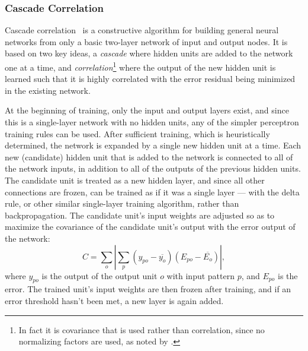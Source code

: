 \documentclass[thesis]{subfiles}
\begin{document}
	\subsubsection{Cascade Correlation}
	Cascade correlation~\citep{Fahlman1989} is a constructive algorithm for building general neural networks from only a basic two-layer network of input and output nodes. It is based on two key ideas, a \emph{cascade} where hidden units are added to the network one at a time, and \emph{correlation}\footnote{In fact it is covariance that is used rather than correlation, since no normalizing factors are used, as noted by \citet{Fahlman1989}.} where the output of the new hidden unit is learned such that it is highly correlated with the error residual being minimized in the existing network.
	
	
	At the beginning of training, only the input and output layers exist,
	and since this is a single-layer network with no hidden units, any of the simpler perceptron training rules can be used. After sufficient training, which is heuristically determined, the network is expanded by a single new hidden unit at a time.
	Each new (candidate) hidden unit that is added to the network is connected to all of the network inputs, in addition to all of the outputs of the previous hidden units. The candidate unit is treated as a new hidden layer, and since all other connections are frozen, can be trained as if it was a single layer --- \ie with the delta rule, or other similar single-layer training algorithm, rather than backpropagation. The candidate unit's input weights are adjusted so as to maximize the covariance of the candidate unit's output with the error output of the network:
	\begin{equation}
	    C = \sum_o \left|\sum_p (y_{po} - \overline{y_o})(E_{po} - \overline{E_o})\right|,
	\end{equation}
	where $y_{po}$ is the output of the output unit $o$ with input pattern $p$, and $E_{po}$ is the error. The trained unit's input weights are then frozen after training, and if an error threshold hasn't been met, a new layer is again added.
	
\end{document}

